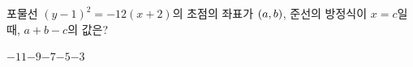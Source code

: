 포물선 $(y-1)^2=-12(x+2)$의 초점의 좌표가 $(a{,}\mkern3mu\mathopen{}b)$, 준선의 방정식이 $x=c$일 때, $a+b-c$의 값은? 
\begin{choices32}{$-11$}{$-9$}{$-7$}{$-5$}{$-3$}\end{choices32}
